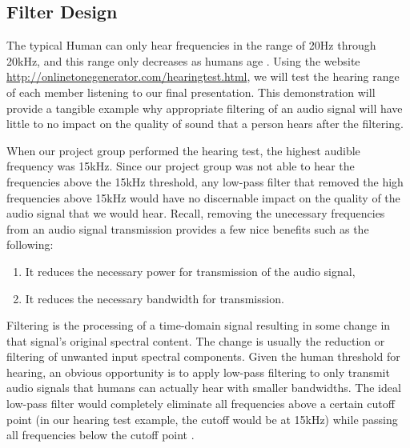 \subsection{Filter Design}

The typical Human can only hear frequencies in the range of 20Hz
through 20kHz, and this range only decreases as humans age
\cite{human:rg}. Using the website
\url{http://onlinetonegenerator.com/hearingtest.html}, we will
test the hearing range of each member listening to our final
presentation. This demonstration will provide a tangible example
why appropriate filtering of an audio signal will have little to
no impact on the quality of sound that a person hears after the  
filtering.

When our project group performed the hearing test, the highest
audible frequency was 15kHz. Since our project group was not able
to hear the frequencies above the 15kHz threshold, any low-pass
filter that removed the high frequencies above 15kHz would have
no discernable impact on the quality of the audio signal that we would hear.
Recall, removing the unecessary frequencies from an audio signal
transmission provides a few nice benefits such as the following:

\begin{enumerate}
\item It reduces the necessary power for transmission of the audio signal,
\item It reduces the necessary bandwidth for transmission.
\end{enumerate}

Filtering is the processing of a time-domain signal resulting in
some change in that signal's original spectral content. The change
is usually the reduction or filtering of unwanted input spectral
components\cite{lyons:intro}. Given the human threshold for
hearing, an obvious opportunity is to apply low-pass filtering to only transmit audio signals that humans can actually hear
with smaller bandwidths. The ideal low-pass filter would
completely eliminate all frequencies above a certain cutoff point
(in our hearing test example, the cutoff would be at 15kHz) while
passing all frequencies below the cutoff point  
\cite{lowpass:wiki}.

